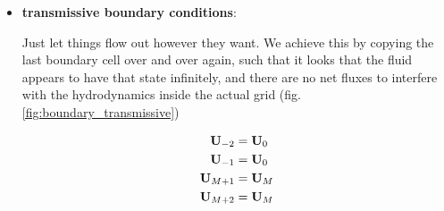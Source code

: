 \begin{itemize}
	
	\item \textbf{transmissive boundary conditions}:
	
		Just let things flow out however they want. 
		We achieve this by copying the last boundary cell over and over again, such that it looks that the fluid appears to have that state infinitely, and there are no net fluxes to interfere with the hydrodynamics inside the actual grid (fig. \ref{fig:boundary_transmissive})
		
		
		\begin{align*}
			\mathbf{U}_{-2} &= \mathbf{U}_0		\\
			\mathbf{U}_{-1} &= \mathbf{U}_0		\\
			\mathbf{U}_{M+1} &= \mathbf{U}_{M}	\\
			\mathbf{U}_{M+2} &= \mathbf{U}_{M}	\\
		\end{align*}	
	
\end{itemize}



